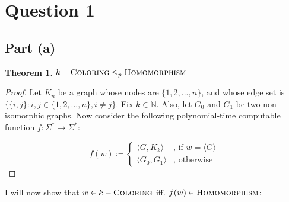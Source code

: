 \documentclass[a4paper,11pt]{scrartcl}
\newcommand{\encode}[1]{\langle #1 \rangle}
\newtheorem{theorem}{Theorem}
\begin{document}
\section*{Question 1}

\subsection*{Part (a)}

\begin{theorem}
$k-\textsc{Coloring} \leq_p \textsc{Homomorphism}$
\end{theorem}
\begin{proof}
    Let ${K_n}$ be a graph whose nodes are $\{ 1, 2, ..., n \}$, and whose edge set is $\{ \{i, j\} : i, j \in \{1, 2, ..., n \}, i \neq j \}$. Fix $k \in \mathbb{N}$. Also, let $G_0$ and $G_1$ be two non-isomorphic graphs. Now consider the following polynomial-time computable function $f : \Sigma^* \rightarrow \Sigma^*$:

\[
    f(w) \coloneqq
    \begin{cases}
        \encode{G, {K_k}} & \text{, if } w = \encode{G} \\
        \encode{G_0, G_1} & \text{, otherwise}
    \end{cases}
\]
\end{proof} 
I will now show that $w \in k-\textsc{Coloring}$ iff. $f(w) \in \textsc{Homomorphism}$:
\end{document}
